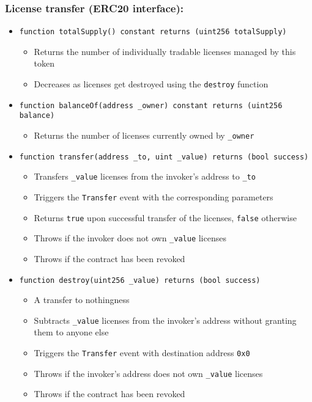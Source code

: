 \documentclass[a4paper]{article}
\begin{document}
\subsubsection{License transfer (ERC20 interface):}

\begin{itemize}
  \item \texttt{function totalSupply() constant returns (uint256 totalSupply)}
  \begin{itemize}
    \item Returns the number of individually tradable licenses managed by this token
    \item Decreases as licenses get destroyed using the \texttt{destroy} function
  \end{itemize}
    
  \item \texttt{function balanceOf(address \_owner) constant returns (uint256 balance)}
  \begin{itemize}
    \item Returns the number of licenses currently owned by \texttt{\_owner}
  \end{itemize}
  
  \item \texttt{function transfer(address \_to, uint \_value) returns (bool success)}
  \begin{itemize}
    \item Transfers \texttt{\_value} licenses from the invoker's address to \texttt{\_to}
    \item Triggers the \texttt{Transfer} event with the corresponding parameters
    \item Returns \texttt{true} upon successful transfer of the licenses, \texttt{false} otherwise
    \item Throws if the invoker does not own \texttt{\_value} licenses
    \item Throws if the contract has been revoked
  \end{itemize}
  
  \item \texttt{function destroy(uint256 \_value) returns (bool success)}
  \begin{itemize}
    \item A transfer to nothingness
    \item Subtracts \texttt{\_value} licenses from the invoker's address without granting them to anyone else
    \item Triggers the \texttt{Transfer} event with destination address \texttt{0x0}
    \item Throws if the invoker's address does not own \texttt{\_value} licenses
    \item Throws if the contract has been revoked
  \end{itemize}
\end{itemize}
\end{document}
